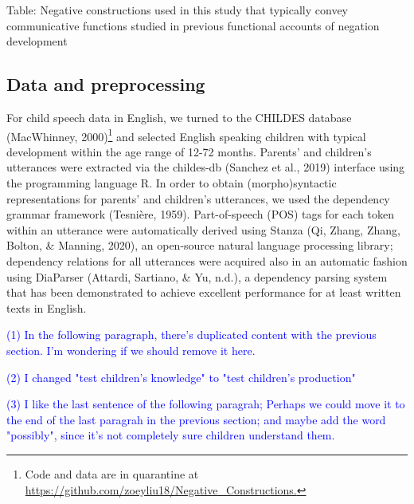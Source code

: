 \documentclass[
  english,
  man,floatsintext]{apa6}
\begin{document}
Table: \label{tab:constructions} Negative constructions used in this study that typically convey communicative functions studied in previous functional accounts of negation development

\hypertarget{data-and-preprocessing}{%
\subsection{Data and preprocessing}\label{data-and-preprocessing}}

For child speech data in English, we turned to the CHILDES database (MacWhinney, 2000)\footnote{Code and data are in quarantine at \url{https://github.com/zoeyliu18/Negative_Constructions.}} and selected English speaking children with typical development within the age range of 12-72 months. Parents' and children's utterances were extracted via the childes-db (Sanchez et al., 2019) interface using the programming language R. In order to obtain (morpho)syntactic representations for parents' and children's utterances, we used the dependency grammar framework (Tesnière, 1959). Part-of-speech (POS) tags for each token within an utterance were automatically derived using Stanza (Qi, Zhang, Zhang, Bolton, \& Manning, 2020), an open-source natural language processing library; dependency relations for all utterances were acquired also in an automatic fashion using DiaParser (Attardi, Sartiano, \& Yu, n.d.), a dependency parsing system that has been demonstrated to achieve excellent performance for at least written texts in English.

\textcolor{blue}{(1) In the following paragraph, there's duplicated content with the previous section. I'm wondering if we should remove it here.}

\textcolor{blue}{(2) I changed "test children's knowledge" to "test children's production"}

\textcolor{blue}{(3) I like the last sentence of the following paragrah; Perhaps we could move it to the end of the last paragrah in the previous section; and maybe add the word "possibly", since it's not completely sure children understand them.}
\end{document}
